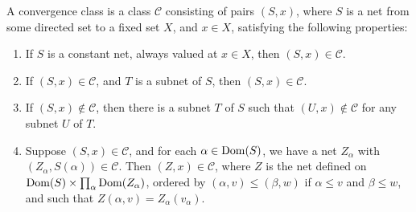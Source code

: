 \begin{definition}
    A convergence class is a class $\mathcal{C}$ consisting of pairs $(S,x)$, where $S$ is a net from some directed set to a fixed set $X$, and $x \in X$, satisfying the following properties:
    \begin{enumerate}
        \item If $S$ is a constant net, always valued at $x \in X$, then $(S,x) \in \mathcal{C}$.
        \item If $(S,x) \in \mathcal{C}$, and $T$ is a subnet of $S$, then $(S,x) \in \mathcal{C}$.
        \item If $(S,x) \not \in \mathcal{C}$, then there is a subnet $T$ of $S$ such that $(U,x) \not \in \mathcal{C}$ for any subnet $U$ of $T$.
        \item Suppose $(S,x) \in \mathcal{C}$, and for each $\alpha \in \operatorname{Dom}(S)$, we have a net $Z_\alpha$ with $(Z_\alpha, S(\alpha)) \in \mathcal{C}$. Then $(Z,x) \in \mathcal{C}$, where $Z$ is the net defined on $\operatorname{Dom}(S) \times \prod_{\alpha} \operatorname{Dom}(Z_\alpha)$, ordered by $(\alpha, v) \leq (\beta, w)$ if $\alpha \leq v$ and $\beta \leq w$, and such that $Z(\alpha, v) = Z_\alpha(v_\alpha)$.
    \end{enumerate}
\end{definition}

